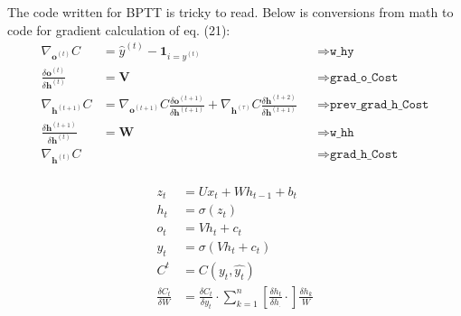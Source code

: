 \documentclass[12pt]{article}
\begin{document}
The code written for BPTT is tricky to read. Below is conversions from math to code for gradient calculation of eq. (21):
\begin{align*}
    \nabla_{\mathbf{o}^{(t)}} C &= \hat{y}^{(t)} - \mathbf{1}_{i=y^{(t)}} &&\Rightarrow \texttt{w\_hy} \\
    \frac{\delta \mathbf{o}^{(t)}}{\delta \mathbf{h}^{(t)}} &= \mathbf{V} &&\Rightarrow \texttt{grad\_o\_Cost} \\
    \nabla_{\mathbf{h}^{(t+1)}} C &= \nabla_{\mathbf{o}^{(t+1)}}C \frac{\delta \mathbf{o}^{(t+1)}}{\delta \mathbf{h}^{(t+1)}} + \nabla_{\mathbf{h}^{(\tau)}}C \frac{\delta \mathbf{h}^{(t+2)}}{\delta \mathbf{h}^{(t+1)}} &&\Rightarrow \texttt{prev\_grad\_h\_Cost} \\
    \frac{\delta \mathbf{h}^{(t+1)}}{\delta \mathbf{h}^{(t)}} &= \mathbf{W} &&\Rightarrow \texttt{w\_hh} \\
    \nabla_{\mathbf{h}^{(t)}} C &&&\Rightarrow \texttt{grad\_h\_Cost} \\
\end{align*}

\begin{align*}
    z_t &= Ux_t + Wh_{t-1} + b_t \\
    h_t &=  \sigma(z_t) \\
    o_t &=  Vh_t + c_t \\
    y_t &=  \sigma(Vh_t + c_t) \\
    C^t &= C(y_t,\hat{y_t}) \\
    \frac{\delta C_t}{\delta W} &= \frac{\delta C_t}{\delta y_t}
    \cdot \sum^n_{k=1}\left[\frac{\delta h_t}{\delta h_.}\cdot\right] \frac{\delta h_k}{W}
\end{align*}



\end{document}
